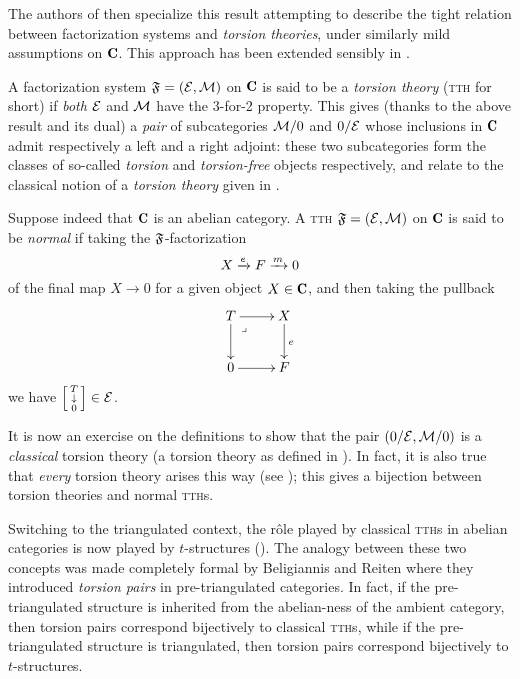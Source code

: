 The authors of \cite{CHK} then specialize this result attempting to describe the tight relation between factorization systems and \emph{torsion theories}, under similarly mild assumptions on $\C$. This approach has been extended sensibly in \cite{rosicky2007factorization}.

A factorization system $\mathfrak{F}=(\mathcal{E},\mathcal{M})$ on $\C$ is said to be a \emph{torsion theory} (\textsc{tth} for short) if \emph{both} $\mathcal{E}$ and $\mathcal{M}$ have the 3-for-2 property. This gives (thanks to the above result and its dual) a \emph{pair} of subcategories $\mathcal{M}/0$ and $0/\mathcal{E}$ whose inclusions in $\C$ admit respectively a left and a right adjoint: these two subcategories form the classes of so\hyp{}called \emph{torsion} and \emph{torsion\hyp{}free} objects respectively, and relate to the classical notion of a \emph{torsion theory} given in \cite{dickson1966torsion}.

Suppose indeed that $\C$ is an abelian category. A \textsc{tth} $\mathfrak{F}=(\mathcal{E},\mathcal{M})$ on $\C$ is said to be \emph{normal} if taking the $\mathfrak{F}$-factorization
\[
X\xrightarrow{e}F\xrightarrow{m}0
\]
of the final map $X\to 0$ for a given object $X\in \C$, and then taking the pullback
\begin{equation}\label{pb_diagram}
\begin{matrix}\xymatrix{
T\ar[r]\ar[d]\ar@{}[dr]|(.25)\lrcorner&X\ar[d]^{e}\\
0\ar[r]&F
}\end{matrix}
\end{equation}
we have $\left[ \begin{smallmatrix} T \\ \downarrow \\ 0 \end{smallmatrix}\right]\in \mathcal{E}$.

It is now an exercise on the definitions to show that the pair $(0/\mathcal{E},\mathcal{M}/0)$ is a \emph{classical} torsion theory (\ie a torsion theory as defined in \cite{dickson1966torsion}). In fact, it is also true that \emph{every} torsion theory arises this way (see \cite{rosicky2007factorization}); this gives a bijection between torsion theories and normal \textsc{tth}s. 

Switching to the triangulated context, the r\^ole played by classical \textsc{tth}s in abelian categories is now played by $t$-structures (\cite{BBD,keller2007derived}). The analogy between these two concepts was made completely formal by Beligiannis and Reiten \cite{beligiannis-reiten} where they introduced \emph{torsion pairs} in pre-triangulated categories. In fact, if the pre-triangulated structure is inherited from the abelian-ness of the ambient category, then torsion pairs correspond bijectively to classical \textsc{tth}s, while if the pre-triangulated structure is triangulated, then torsion pairs correspond bijectively to $t$-structures. %


